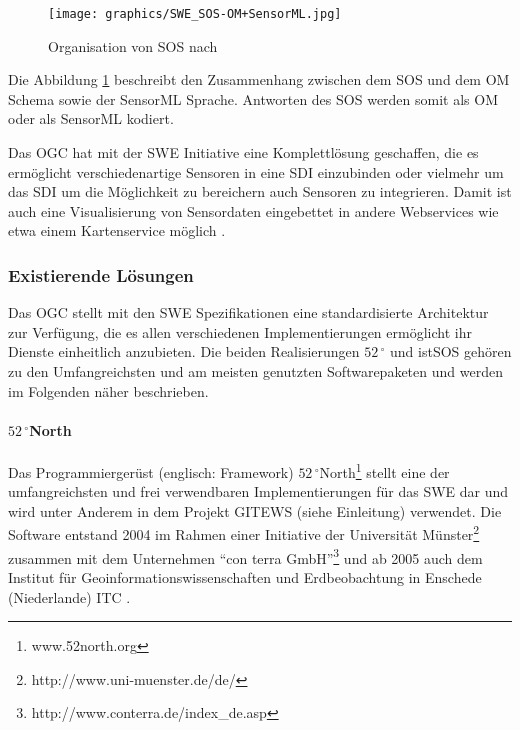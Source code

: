 \citep{botts_ogc_2008}\citep{woolf_gigas_2008}\citep{kunkel_teodoor:_2012}\citep{walkowski_sensor_2008}

\begin{figure}[H]
	\centering
 	 \texttt{[image: graphics/SWE\_SOS-OM+SensorML.jpg]} 
	\caption{Organisation von SOS nach \citep{ansorge_web_2012}}
	 \label{fig:swe_sos-om+sml}
\end{figure}

Die Abbildung \ref{fig:swe_sos-om+sml} beschreibt den Zusammenhang zwischen dem \gls{SOS} und dem \gls{OM} Schema sowie der \gls{SensorML} Sprache. Antworten des \gls{SOS} werden somit als \gls{OM} oder als \gls{SensorML} kodiert.

Das \gls{OGC} hat mit der \gls{SWE} Initiative eine Komplettlösung geschaffen, die es ermöglicht verschiedenartige Sensoren in eine  \gls{SDI} einzubinden oder vielmehr um das \gls{SDI} um die Möglichkeit zu bereichern auch Sensoren zu integrieren. Damit ist auch eine Visualisierung von Sensordaten eingebettet in andere Webservices wie etwa einem Kartenservice möglich \citep{broring_new_2011}\citep{walkowski_sensor_2008}.


\subsubsection{Existierende Lösungen}
Das \gls{OGC} stellt mit den \gls{SWE} Spezifikationen eine standardisierte Architektur zur Verfügung, die es allen verschiedenen Implementierungen ermöglicht ihr Dienste einheitlich anzubieten. Die beiden Realisierungen $52\,^{\circ}$ und istSOS gehören zu den Umfangreichsten und am meisten genutzten Softwarepaketen und werden im Folgenden näher beschrieben.


\paragraph{$52\,^{\circ}$North}
Das Programmiergerüst (englisch: Framework) $52\,^{\circ}$North\footnote{www.52north.org} stellt eine der umfangreichsten und frei verwendbaren Implementierungen für das \gls{SWE} dar und wird unter Anderem in dem Projekt \gls{GITEWS} (siehe Einleitung) verwendet. Die Software entstand 2004 im Rahmen einer Initiative der Universität Münster\footnote{http://www.uni-muenster.de/de/} zusammen mit dem Unternehmen ``con terra GmbH''\footnote{http://www.conterra.de/index\_de.asp} und ab 2005 auch dem Institut für Geoinformationswissenschaften und Erdbeobachtung in Enschede (Niederlande) \gls{ITC} \citep{botts_ogc_2008}\citep{kraak_what_2005}. 

